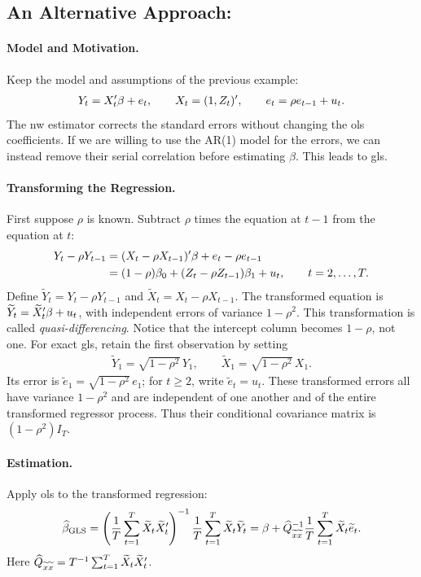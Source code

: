 \documentclass[a4paper,12pt]{article}
\begin{document}
\subsection{An Alternative Approach: }

\paragraph{Model and Motivation.}
Keep the model and assumptions of the previous example:
\begin{align}
	Y_t=X_t^{\prime}\beta+e_t,\qquad X_t=(1,Z_t)^{\prime},\qquad
	e_t=\rho e_{t-1}+u_t.
\end{align}
The \gls{nw} estimator corrects the standard errors without changing the \gls{ols} coefficients.
If we are willing to use the AR(1) model for the errors, we can instead remove their serial correlation
before estimating $\beta$.
This leads to \gls{gls}.

\paragraph{Transforming the Regression.}
First suppose $\rho$ is known.
Subtract $\rho$ times the equation at $t-1$ from the equation at $t$:
\begin{align}
	Y_t-\rho Y_{t-1}
	&=(X_t-\rho X_{t-1})^{\prime}\beta+e_t-\rho e_{t-1}\notag\\
	&=(1-\rho)\beta_0+(Z_t-\rho Z_{t-1})\beta_1+u_t,
	\qquad t=2,\ldots,T.
\end{align}
Define $\widetilde Y_t=Y_t-\rho Y_{t-1}$ and
$\widetilde X_t=X_t-\rho X_{t-1}$.
The transformed equation is $\widetilde Y_t=\widetilde X_t^{\prime}\beta+u_t$,
with independent errors of variance $1-\rho^2$.
This transformation is called \emph{quasi-differencing}.
Notice that the intercept column becomes $1-\rho$, not one.
For exact \gls{gls}, retain the first observation by setting
\begin{align}
	\widetilde Y_1=\sqrt{1-\rho^2}\,Y_1,
	\qquad \widetilde X_1=\sqrt{1-\rho^2}\,X_1.
\end{align}
Its error is $\widetilde e_1=\sqrt{1-\rho^2}\,e_1$;
for $t\ge2$, write $\widetilde e_t=u_t$.
These transformed errors all have variance $1-\rho^2$ and are independent of one another
and of the entire transformed regressor process.
Thus their conditional covariance matrix is $(1-\rho^2)I_T$.

\paragraph{Estimation.}
Apply \gls{ols} to the transformed regression:
\begin{align}
	\widehat\beta_{\mathrm{GLS}}
	=\left(\frac1T\sum_{t=1}^T\widetilde X_t\widetilde X_t^{\prime}\right)^{-1}
	\frac1T\sum_{t=1}^T\widetilde X_t\widetilde Y_t
	=\beta+\widehat Q_{\widetilde x\widetilde x}^{-1}
	\frac1T\sum_{t=1}^T\widetilde X_t\widetilde e_t.
\end{align}
Here $\widehat Q_{\widetilde x\widetilde x}=T^{-1}\sum_{t=1}^T\widetilde X_t\widetilde X_t^{\prime}$.
\end{document}

